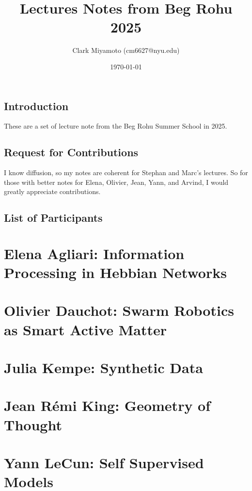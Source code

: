 \documentclass[12pt,fleqn]{book}
\title{Lectures Notes from Beg Rohu 2025}
\author{Clark Miyamoto (cm6627@nyu.edu)}
\date{\today}
\numberwithin{equation}{section} %
\begin{document}
\maketitle
\section{Introduction}
These are a set of lecture note from the Beg Rohu Summer School in 2025.

\section{Request for Contributions}
I know diffusion, so my notes are coherent for Stephan and Marc's lectures. So for those with better notes for Elena, Olivier, Jean, Yann, and Arvind, I would greatly appreciate contributions.

\section{List of Participants}




\tableofcontents
\newpage

\chapter{Elena Agliari: Information Processing in Hebbian Networks}

\newpage

\chapter{Olivier Dauchot: Swarm Robotics as Smart Active Matter}

\newpage

\chapter{Julia Kempe: Synthetic Data}

\newpage

\chapter{Jean R\'emi King: Geometry of Thought}

\newpage

\chapter{Yann LeCun: Self Supervised Models}

\newpage
\end{document}
